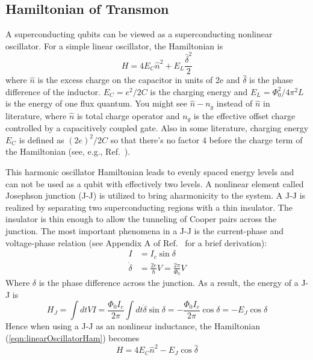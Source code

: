     \subsection{Hamiltonian of Transmon} %
    \label{sub:hamiltonian_of_transmon}
    A superconducting qubits can be viewed as a superconducting nonlinear oscillator. For a simple linear oscillator, the Hamiltonian is
    \begin{equation}
    \label{eqn:linearOscillatorHam}
        H = 4E_C \hat n^2 + E_L \frac{\hat \delta^2}{2}
    \end{equation}
    where $\hat n$ is the excess charge on the capacitor in units of 2e and $ \hat \delta  $ is the phase difference of the inductor. $E_C = e^2/2C$ is the charging energy\cite{koch2007charge} and $E_L = \Phi_0^2/4 \pi^2 L $ is the energy of one flux quantum. You might see $\hat n - n_g$ instead of $\hat n$ in literature, where $\hat n$ is total charge operator and $n_g$ is the effective offset charge controlled by a capacitively coupled gate. Also in some literature, charging energy $E_C$ is defined as $ (2e)^2/2C $ so that there's no factor $4$ before the charge term of the Hamiltonian (see, e.g., Ref.~).

    This harmonic oscillator Hamiltonian leads to evenly spaced energy levels and can not be used as a qubit with effectively two levels. A nonlinear element called Josephson junction (J-J) is utilized to bring aharmonicity to the system. A J-J is realized by separating two superconducting regions with a thin insulator. The insulator is thin enough to allow the tunneling of Cooper pairs across the junction. The most important phenomena in a J-J is the current-phase and voltage-phase relation (see Appendix A of Ref.~ for a brief derivation):
    \begin{align}
    \label{eqn:currentVoltagePhase}
        I &= I_c \sin \delta \\
        \dot \delta & = \frac{2e}{\hbar} V = \frac{2 \pi}{\Phi_0} V
    \end{align}
    Where $ \delta $ is the phase difference across the junction. As a result, the energy of a J-J is\cite{Raab2015}
    \begin{equation}
        H_J = \int dt VI = \frac{\Phi_0 I_c}{2 \pi}\int dt \dot \delta \sin \delta = -\frac{\Phi_0 I_c}{2 \pi}\cos \delta = -E_J \cos \delta
    \end{equation}
    Hence when using a J-J as an nonlinear inductance, the Hamiltonian (\ref{eqn:linearOscillatorHam}) becomes
    \begin{equation}
        H = 4E_C \hat n^2 -E_J \cos \hat \delta  
    \end{equation}

